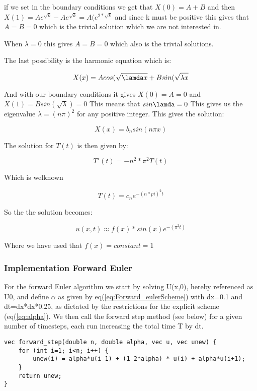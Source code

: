 \documentclass[a4paper,10pt]{article}
\begin{document}
if we set in the boundary conditions we get that $X(0) = A+B$ and then $X(1) = Ae^{\sqrt{k}} - Ae^{\sqrt{k}} = A(e^{2*\sqrt{k}}$ and since k must
be positive this gives that $A=B=0$ which is the trivial solution which we are not interested in.

When $\lambda = 0 $ this gives $A=B=0$ which also is the trivial solutions.

The last possibility is the harmonic equation which is:

\begin{equation}

 X(x) = Acos(\sqrt{\lamda x} + Bsin(\sqrt{\lambda x}
\end{equation}

And with our boundary conditions it gives $X(0) = A = 0$ and $X(1) = Bsin(\sqrt{\lambda}) = 0$
This means that $sin\lamda = 0$ This gives us the eigenvalue $\lambda = (n\pi)^2$ for any positive integer.
This gives the solution:

\begin{equation}
 X(x) = b_nsin(n\pi x)
\end{equation}

The solution for $T(t)$ is then given by:

\begin{equation}
 T'(t) = -n^2*\pi ^2 T(t)
\end{equation}

Which is welknown 

\begin{equation}
 T(t) = c_ne^{-(n*pi)^2t}
\end{equation}

So the the solution becomes:

\begin{equation}
 u(x,t) \approx f(x)*sin(x)e^{-(\pi^2t)}
 \end{equation}

 Where we have used that $f(x) = constant = 1$


\subsubsection{Implementation Forward Euler}
For the forward Euler algorithm we start by solving U(x,0), hereby referenced as U0, and define $\alpha$ as given by eq(\ref{eq:Forward_eulerScheme}) with dx=0.1 and dt=dx*dx*0.25, as dictated by the
restrictions for the explicit scheme (eq(\ref{eq:alpha}). We then call the forward step method (see below) for a given number of timesteps, each run increasing the total time T by dt.
\begin{verbatim}
vec forward_step(double n, double alpha, vec u, vec unew) {
    for (int i=1; i<n; i++) {
        unew(i) = alpha*u(i-1) + (1-2*alpha) * u(i) + alpha*u(i+1);
    }
    return unew;
} 
\end{verbatim}
\end{document}
